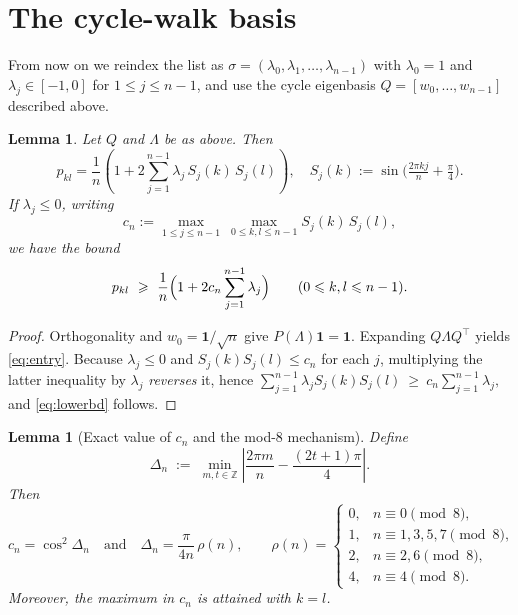 \documentclass[12pt,fleqn]{amsart}
\renewcommand{\le}{\leqslant}
\renewcommand{\ge}{\geqslant}
\newtheorem{lem}[thm]{Lemma}
\theoremstyle{remark}
\newcommand{\1}{\mathbf{1}}
\newcommand{\Lam}{\Lambda}
\begin{document}
\section{The cycle-walk basis}\label{sec:cycle}
From now on we reindex the list as $\sigma=(\lambda_0,\lambda_1,\ldots,\lambda_{n-1})$ with $\lambda_0=1$ and $\lambda_j\in[-1,0]$ for $1\le j\le n-1$, and use the cycle eigenbasis $Q=[w_0,\dots,w_{n-1}]$ described above.

\begin{lem}\label{lem:entrybound}
Let $Q$ and $\Lam$ be as above. Then
\begin{equation}\label{eq:entry}
p_{kl}
=\frac1n\!\left(1+2\sum_{j=1}^{n-1}\lambda_j\,S_j(k)\,S_j(l)\right),
\quad
S_j(k):=\sin\!\Big(\tfrac{2\pi kj}{n}+\tfrac{\pi}{4}\Big).
\end{equation}
If $\lambda_j\le 0$, writing
\[
c_n:=\max_{1\le j\le n-1}\ \max_{0\le k,l\le n-1} S_j(k)\,S_j(l),
\]
we have the bound
\begin{equation}\label{eq:lowerbd}
p_{kl}\ \ge\ \frac1n\Bigl(1+2c_n\sum_{j=1}^{n-1}\lambda_j\Bigr)\qquad(0 \le k, l \le n-1).
\end{equation}
\end{lem}

\begin{proof}
Orthogonality and $w_0=\1/\sqrt n$ give $P(\Lam)\1=\1$. Expanding $Q\Lam Q^\top$ yields \eqref{eq:entry}. Because $\lambda_j\le0$ and $S_j(k)S_j(l)\le c_n$ for each $j$, multiplying the latter inequality by $\lambda_j$ \emph{reverses} it, hence
\(
\sum_{j=1}^{n-1}\lambda_j S_j(k)S_j(l)\ \ge\ c_n\sum_{j=1}^{n-1}\lambda_j,
\)
and \eqref{eq:lowerbd} follows.
\end{proof}

\begin{lem}[Exact value of $c_n$ and the mod-$8$ mechanism]\label{lem:cn}
Define
\[
\Delta_n \;:=\; \min_{m,t\in\mathbb Z}\left|\frac{2\pi m}{n}-\frac{(2t+1)\pi}{4}\right|.
\]
Then
\[
c_n=\cos^2\Delta_n
\quad\text{and}\quad
\Delta_n=\frac{\pi}{4n}\,\rho(n),
\qquad
\rho(n)=
\begin{cases}
0,& n\equiv0\pmod{8},\\
1,& n\equiv1,3,5,7\pmod{8},\\
2,& n\equiv2,6\pmod{8},\\
4,& n\equiv4\pmod{8}.
\end{cases}
\]
Moreover, the maximum in $c_n$ is attained with $k=l$.
\end{lem}
\end{document}

